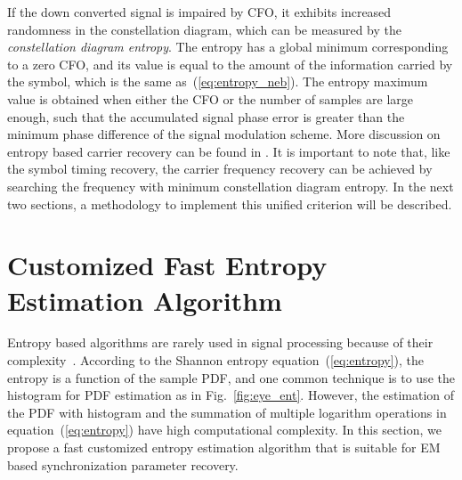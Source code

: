 \documentclass[journal,comsoc, onecolumn, 12pt,draftclsnofoot]{IEEEtran} %
\begin{document}
If the down converted signal is impaired by CFO, it exhibits increased randomness in the constellation diagram, which can be measured by the \textit{constellation diagram entropy}.
The entropy has a global minimum corresponding to a zero CFO, and its value is equal to the amount of the information carried by the symbol, which is the same as~(\ref{eq:entropy_neb}).
The entropy maximum value is obtained when either the CFO or the number of samples are large enough,
such that the accumulated signal phase error is greater than the minimum phase difference of the signal modulation scheme. 
More discussion on entropy based carrier recovery can be found in \cite{Pedzisz2006}.
It is important to note that, like the symbol timing recovery, the carrier frequency recovery can be achieved by searching the frequency with minimum constellation diagram entropy.
In the next two sections, a methodology to implement this unified criterion will be described.

\section{Customized Fast Entropy Estimation Algorithm}
\label{sec:cust_entp}
Entropy based algorithms are rarely used in signal processing because of their complexity~\cite{Bercher2000}.
According to the Shannon entropy equation~(\ref{eq:entropy}), the entropy is a function of the sample PDF, and one common technique is to use the histogram for PDF estimation as in Fig.~\ref{fig:eye_ent}.
However, the estimation of the PDF with histogram and the summation of multiple logarithm operations  in equation~(\ref{eq:entropy}) have high computational complexity.
In this section, we propose a fast customized entropy estimation algorithm that is suitable for EM based synchronization parameter recovery. 
\end{document}

